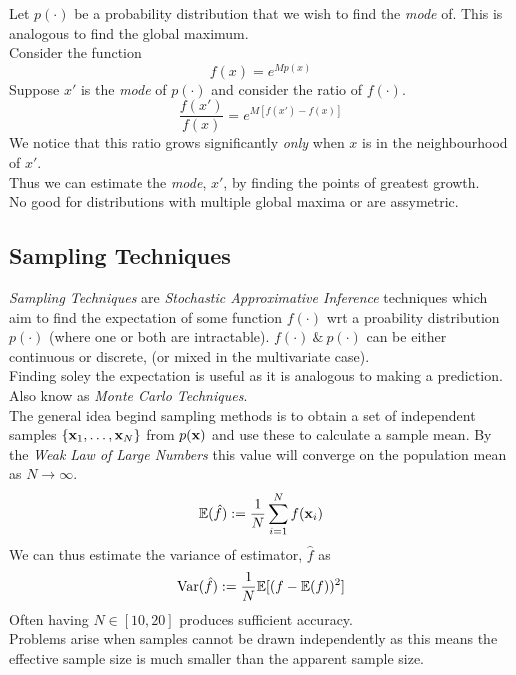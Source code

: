 \documentclass[11pt,a4paper]{article}
\begin{document}
Let $p(\cdot)$ be a probability distribution that we wish to find the \textit{mode} of. This is analogous to find the global maximum.\\
Consider the function
$$f(x)=e^{Mp(x)}$$
Suppose $x'$ is the \textit{mode} of $p(\cdot)$ and consider the ratio of $f(\cdot)$.
$$\frac{f(x')}{f(x)}=e^{M[f(x')-f(x)]}$$
We notice that this ratio grows significantly \textit{only} when $x$ is in the neighbourhood of $x'$.\\
Thus we can estimate the \textit{mode}, $x'$, by finding the points of greatest growth.\\

No good for distributions with multiple global maxima or are assymetric.

\subsection{Sampling Techniques}

\textit{Sampling Techniques} are \textit{Stochastic Approximative Inference} techniques which aim to find the expectation of some function $f(\cdot)$ wrt a proability distribution $p(\cdot)$ (where one or both are intractable). $f(\cdot)\ \&\ p(\cdot)$ can be either continuous or discrete, (or mixed in the multivariate case).\\
\nb Finding soley the expectation is useful as it is analogous to making a prediction.\\
\nb Also know as \textit{Monte Carlo Techniques}.\\

The general idea begind sampling methods is to obtain a set of independent samples $\{\textbf{x}_1,\dots,\textbf{x}_N\}$ from $p(\textbf{x})$ and use these to calculate a sample mean. By the \textit{Weak Law of Large Numbers} this value will converge on the population mean as $N\to\infty$.
$$\mathbb{E}(\hat f):=\frac1N\sum_{i=1}^Nf(\textbf{x}_i)$$
We can thus estimate the variance of estimator, $\hat f$ as
$$\mathrm{Var}(\hat f):=\frac{1}{N}\mathbb{E}[(f-\mathbb{E}(f))^2]$$
\nb Often having $N\in[10,20]$ produces sufficient accuracy.\\
\nb Problems arise when samples cannot be drawn independently as this means the effective sample size is much smaller than the apparent sample size.\\
\end{document}
